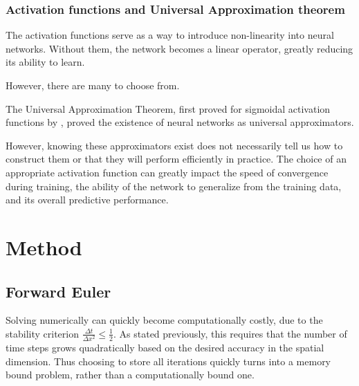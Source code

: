 \documentclass{article}
\theoremstyle{definition}
\begin{document}

\subsubsection{Activation functions and Universal Approximation theorem}
The activation functions serve as a way to introduce non-linearity into neural networks. Without them, the network becomes a linear operator, greatly reducing its ability to learn.   

However, there are many to choose from.

The Universal Approximation Theorem, first proved for sigmoidal activation functions by \textcite{universalapprox}, proved the existence of neural networks as universal approximators. 

However, knowing these approximators exist does not necessarily
tell us how to construct them or that they will perform efficiently in practice. The choice of an appropriate activation function can greatly impact the speed of convergence during training, the ability of the network to generalize from the training data, and its overall predictive performance.



\newpage
\section{Method}
\subsection{Forward Euler}
Solving numerically can quickly become computationally costly, due to the stability criterion $\frac{\Delta t}{\Delta x^2} \leq \frac{1}{2}$. As stated previously, this requires that the number of time steps grows quadratically based on the desired accuracy in the spatial dimension. Thus choosing to store all iterations quickly turns into a memory bound problem, rather than a computationally bound one.
\end{document}
